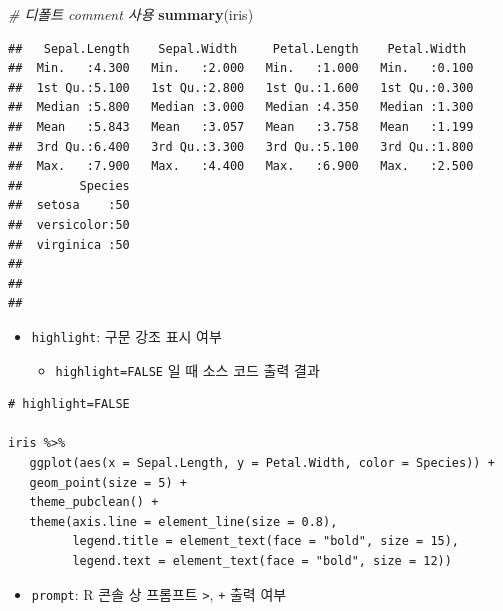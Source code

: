 \documentclass[
  11pt,
]{krantz}
\newenvironment{Shaded}{\begin{snugshade}}{\end{snugshade}}
\newcommand{\CommentTok}[1]{\textcolor[rgb]{0.37,0.37,0.37}{\textit{#1}}}
\newcommand{\KeywordTok}[1]{\textcolor[rgb]{0.27,0.27,0.27}{\textbf{#1}}}
\newcommand{\NormalTok}[1]{#1}
\providecommand{\tightlist}{%
  \setlength{\itemsep}{0pt}\setlength{\parskip}{0pt}}
\begin{document}
\footnotesize

\begin{Shaded}
\begin{Highlighting}[]
\CommentTok{# 디폴트 comment 사용}
\KeywordTok{summary}\NormalTok{(iris)}
\end{Highlighting}
\end{Shaded}

\begin{verbatim}
##   Sepal.Length    Sepal.Width     Petal.Length    Petal.Width   
##  Min.   :4.300   Min.   :2.000   Min.   :1.000   Min.   :0.100  
##  1st Qu.:5.100   1st Qu.:2.800   1st Qu.:1.600   1st Qu.:0.300  
##  Median :5.800   Median :3.000   Median :4.350   Median :1.300  
##  Mean   :5.843   Mean   :3.057   Mean   :3.758   Mean   :1.199  
##  3rd Qu.:6.400   3rd Qu.:3.300   3rd Qu.:5.100   3rd Qu.:1.800  
##  Max.   :7.900   Max.   :4.400   Max.   :6.900   Max.   :2.500  
##        Species  
##  setosa    :50  
##  versicolor:50  
##  virginica :50  
##                 
##                 
## 
\end{verbatim}

\normalsize

\begin{itemize}
\tightlist
\item
  \texttt{highlight}: 구문 강조 표시 여부

  \begin{itemize}
  \tightlist
  \item
    \texttt{highlight=FALSE} 일 때 소스 코드 출력 결과
  \end{itemize}
\end{itemize}

\footnotesize

\begin{verbatim}
# highlight=FALSE

iris %>%
   ggplot(aes(x = Sepal.Length, y = Petal.Width, color = Species)) +
   geom_point(size = 5) +
   theme_pubclean() +
   theme(axis.line = element_line(size = 0.8),
         legend.title = element_text(face = "bold", size = 15),
         legend.text = element_text(face = "bold", size = 12))
\end{verbatim}

\normalsize

\begin{itemize}
\tightlist
\item
  \texttt{prompt}: R 콘솔 상 프롬프트 \texttt{\textgreater{}}, \texttt{+} 출력 여부
\end{itemize}
\end{document}
